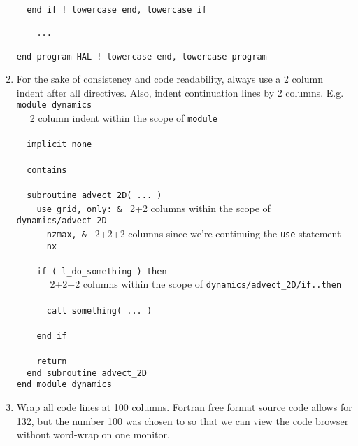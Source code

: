 \documentclass[letterpaper,12pt]{article}
\begin{document}
\begin{enumerate}
\begin{verbatim}
  end if ! lowercase end, lowercase if

    ...

end program HAL ! lowercase end, lowercase program 
\end{verbatim}

\item For the sake of consistency and code readability, always use a 2 column 
indent after all directives. Also, indent continuation lines by 2 columns. \newline
E.g. \\
\verb|module dynamics| \\
\verb*|  | {\small 2 column indent within the scope of \texttt{module}} \\
\verb|| \\
\verb*|  implicit|\verb| none| \\
\verb|| \\
\verb*|  contains| \\
\verb|| \\
\verb*|  subroutine|\verb| advect_2D( ... )| \\
\verb*|    use|\verb| grid, only: & | {\small 2+2 columns within the scope of \texttt{dynamics/advect\_2D}} \\
\verb*|      nzmax,|\verb| & | {\small 2+2+2 columns since we're continuing the \texttt{use} statement}  \\
\verb*|      nx| \\
\verb|| \\
\verb*|    if|\verb| ( l_do_something ) then| \\
\verb*|      | {\small 2+2+2 columns within the scope of \texttt{dynamics/advect\_2D/if..then}} \\
\verb|| \\
\verb*|      |\verb|call something( ... )| \\
\verb|| \\
\verb*|    end|\verb| if| \\
\verb|| \\
\verb*|    return| \\
\verb*|  end|\verb| subroutine advect_2D| \\

\verb|end module dynamics|

\item Wrap all code lines at 100 columns.  Fortran free format source code
allows for 132, but the number 100 was chosen to so that we can view the code 
browser without word-wrap on one monitor.


\end{enumerate}
\end{document}
